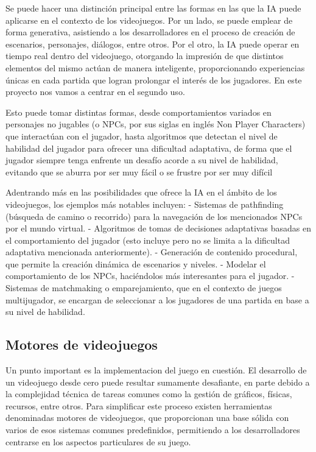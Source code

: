 \documentclass{article}
\begin{document}
Se puede hacer una distinción principal entre las formas en las que la IA puede aplicarse en el contexto de los videojuegos. Por un lado, se puede emplear de forma generativa, asistiendo a los desarrolladores en el proceso de creación de escenarios, personajes, diálogos, entre otros. Por el otro, la IA puede operar en tiempo real dentro del videojuego, otorgando la impresión de que distintos elementos del mismo actúan de manera inteligente, proporcionando experiencias únicas en cada partida que logran prolongar el interés de los jugadores. En este proyecto nos vamos a centrar en el segundo uso.

Esto puede tomar distintas formas, desde comportamientos variados en personajes no jugables (o NPCs, por sus siglas en inglés Non Player Characters) que interactúan con el jugador, hasta algoritmos que detectan el nivel de habilidad del jugador para ofrecer una dificultad adaptativa, de forma que el jugador siempre tenga enfrente un desafío acorde a su nivel de habilidad, evitando que se aburra por ser muy fácil o se frustre por ser muy difícil \cite{recent_research_on_ai_in_games}

Adentrando más en las posibilidades que ofrece la IA en el ámbito de los videojuegos, los ejemplos más notables incluyen:
-	Sistemas de pathfinding (búsqueda de camino o recorrido) para la navegación de los mencionados NPCs por el mundo virtual.
-	Algoritmos de tomas de decisiones adaptativas basadas en el comportamiento del jugador (esto incluye pero no se limita a la dificultad adaptativa mencionada anteriormente).
-	Generación de contenido procedural, que permite la creación dinámica de escenarios y niveles.
-	Modelar el comportamiento de los NPCs, haciéndolos más interesantes para el jugador.
-	Sistemas de matchmaking o emparejamiento, que en el contexto de juegos multijugador, se encargan de seleccionar a los jugadores de una partida en base a su nivel de habilidad.

\subsection{Motores de videojuegos}

Un punto important es la implementacion del juego en cuestión. El desarrollo de un videojuego desde cero puede resultar sumamente desafiante, en parte debido a la complejidad técnica de tareas comunes como la gestión de gráficos, físicas, recursos, entre otros. Para simplificar este proceso existen herramientas denominadas motores de videojuegos, que proporcionan una base sólida con varios de esos sistemas comunes predefinidos, permitiendo a los desarrolladores centrarse en los aspectos particulares de su juego.
\end{document}
